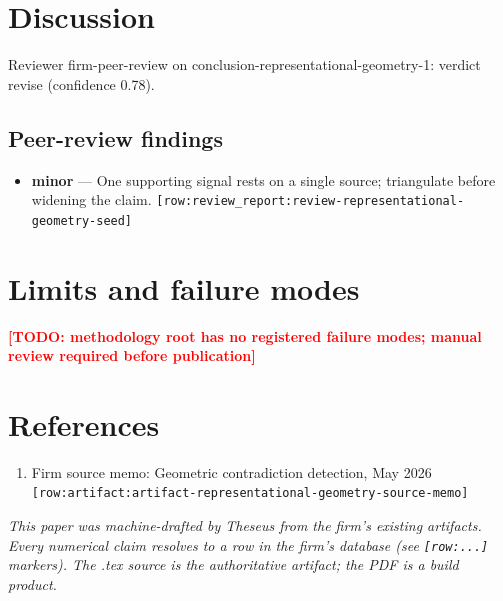 \documentclass[11pt,letterpaper]{article}
\newcommand{\todomark}[1]{\textcolor{red}{\textbf{[TODO: #1]}}}
\newcommand{\rowref}[1]{\texttt{\small[row:#1]}}
\begin{document}
\section{Discussion}
Reviewer firm-peer-review on conclusion-representational-geometry-1: verdict revise (confidence 0.78).
\subsection*{Peer-review findings}
\begin{itemize}[leftmargin=1.5em]
  \item \textbf{minor} --- One supporting signal rests on a single source; triangulate before widening the claim.
        \rowref{review\_report:review-representational-geometry-seed}
\end{itemize}
\section{Limits and failure modes}
\todomark{methodology root has no registered failure modes; manual review required before publication}
\section{References}
\begin{enumerate}[leftmargin=2em]
  \item Firm source memo: Geometric contradiction detection, May 2026 \rowref{artifact:artifact-representational-geometry-source-memo}
\end{enumerate}

\vfill
\begin{center}\small
\textit{This paper was machine-drafted by Theseus from the firm's existing
artifacts. Every numerical claim resolves to a row in the firm's
database (see \rowref{...} markers). The .tex source is the authoritative
artifact; the PDF is a build product.}
\end{center}
\end{document}
